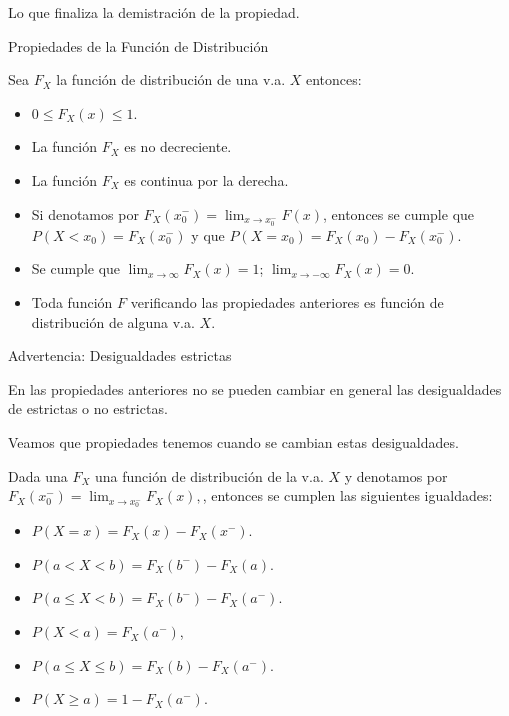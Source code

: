 \documentclass[
  letterpaper,
  DIV=11,
  numbers=noendperiod]{scrreprt}
\providecommand{\tightlist}{%
  \setlength{\itemsep}{0pt}\setlength{\parskip}{0pt}}\usepackage{longtable,booktabs,array}
\begin{document}
Lo que finaliza la demistración de la propiedad.

\begin{Proposicion}{Propiedades de la Función de Distribución}{}

Sea \(F_{X}\) la función de distribución de una v.a. \(X\) entonces:

\begin{itemize}
\tightlist
\item
  \(0\leq F_{X}(x)\leq 1\).
\item
  La función \(F_{X}\) es no decreciente.
\item
  La función \(F_{X}\) es continua por la derecha.
\item
  Si denotamos por
  \(F_X(x_0^{-})=\displaystyle \lim_{x\to x_0^{-}} F(x)\), entonces se
  cumple que \(P(X< x_0)=F_X(x_0^{-})\) y que
  \(P(X=x_0)=F_X(x_0)-F_X(x_0^{-})\).
\item
  Se cumple que \(\displaystyle \lim_{x\to\infty} F_{X}(x)=1\);
  \(\displaystyle \lim_{x\to-\infty}F_{X}(x)=0\).
\item
  Toda función \(F\) verificando las propiedades anteriores es función
  de distribución de alguna v.a. \(X\).
\end{itemize}

\end{Proposicion}

\begin{Advertencia}{Advertencia: Desigualdades estrictas}{}

En las propiedades anteriores no se pueden cambiar en general las
desigualdades de estrictas o no estrictas.

Veamos que propiedades tenemos cuando se cambian estas desigualdades.

Dada una \(F_{X}\) una función de distribución de la v.a. \(X\) y
denotamos por
\(F_{X}(x_0^{-})=\displaystyle \lim_{x\to x_0^{-}} F_{X}(x),\), entonces
se cumplen las siguientes igualdades:

\begin{itemize}
\tightlist
\item
  \(P(X=x)=F_{X}(x)-F_{X}(x^{-})\).
\item
  \(P(a< X< b)=F_{X}(b^{-})-F_{X}(a)\).
\item
  \(P(a\leq X< b)=F_{X}(b^{-})-F_{X}(a^{-})\).
\item
  \(P(X<a)=F_{X}(a^{-})\),
\item
  \(P(a\leq X\leq b)=F_{X}(b)-F_{X}(a^{-})\).
\item
  \(P(X\geq a)=1-F_{X}(a^{-})\).
\end{itemize}

\end{Advertencia}
\end{document}
